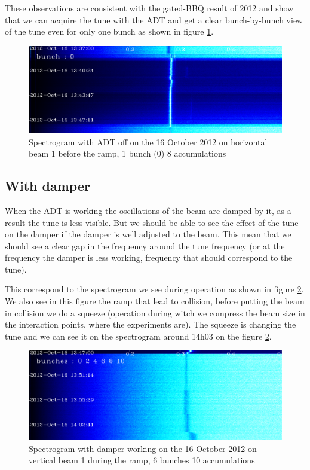 	These observations are consistent with the gated-\gls{BBQ} result of 2012 \cite{Valuch12} and show that we can acquire the tune with the \gls{ADT} and get a clear bunch-by-bunch view of the tune even for only one bunch as shown in figure \ref{fig:bunch_0_adt_off}.

	\begin{figure}[H]
	\caption{Spectrogram with ADT off on the 16 October 2012 on horizontal beam 1 before the ramp, 1 bunch (0) 8 accumulations}
	\label{fig:bunch_0_adt_off}
	\centering
	\includegraphics[scale=0.3]{md-121016-hb1-m1-bunch000001-8acc-1337-1349.pdf}
	\end{figure}

	\subsection{With damper}

	When the \gls{ADT} is working the oscillations of the beam are damped by it, as a result the tune is less visible. But we should be able to see the effect of the tune on the damper if the damper is well adjusted to the beam. This mean that we should see a clear gap in the frequency around the tune frequency (or at the frequency the damper is less working, frequency that should correspond to the tune).

	This correspond to the spectrogram we see during operation as shown in figure \ref{fig:ramp}. We also see in this figure the ramp that lead to collision, before putting the beam in collision we do a squeeze (operation during witch we compress the beam size in the interaction points, where the experiments are). The squeeze is changing the tune and we can see it on the spectrogram around 14h03 on the figure \ref{fig:ramp}.

	\begin{figure}[H]
	\caption{Spectrogram with damper working on the 16 October 2012 on vertical beam 1 during the ramp, 6 bunches 10 accumulations}
	\centering
	\label{fig:ramp}
	\includegraphics[scale=0.3]{md-121016-vb1-m1-6bunches-10acc-1347-1405-ramp.pdf}
	\end{figure}


